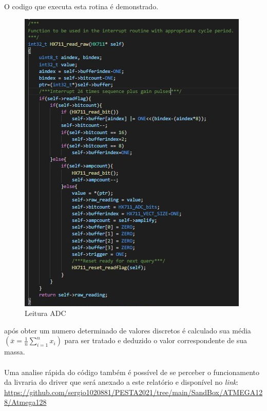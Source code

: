 \newpage
O codigo que executa esta rotina é demonstrado.
\begin{figure}[H]
	\centering
	\includegraphics[scale=0.8]{./image/PESTA/Code/read_raw.jpg}
	\caption{Leitura ADC}
	\label{read_raw}
\end{figure}
após obter um numero determinado de valores discretos é calculado sua média $\left( \overline{x}  =  \frac{1}{n}\sum_{i=1}^n x_i \right)$ para ser tratado e deduzido o valor correspondente de sua massa. \\
\\
Uma analise rápida do código também é possível de se perceber o funcionamento da livraria do driver que será anexado a este relatório e disponível no \textit{link}: \url{https://github.com/sergio1020881/PESTA2021/tree/main/SandBox/ATMEGA128/Atmega128}
\newpage
